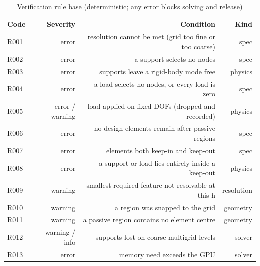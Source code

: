 \begin{table}[t]
\centering\small
\caption{Verification rule base (deterministic; any error blocks solving and release)}
\label{tab:t2_rules}
\begin{tabular}{lrrr}
\toprule
Code & Severity & Condition & Kind \\
\midrule
R001 & error & resolution cannot be met (grid too fine or too coarse) & spec \\
R002 & error & a support selects no nodes & spec \\
R003 & error & supports leave a rigid-body mode free & physics \\
R004 & error & a load selects no nodes, or every load is zero & spec \\
R005 & error / warning & load applied on fixed DOFs (dropped and recorded) & physics \\
R006 & error & no design elements remain after passive regions & spec \\
R007 & error & elements both keep-in and keep-out & spec \\
R008 & error & a support or load lies entirely inside a keep-out & physics \\
R009 & warning & smallest required feature not resolvable at this h & resolution \\
R010 & warning & a region was snapped to the grid & geometry \\
R011 & warning & a passive region contains no element centre & geometry \\
R012 & warning / info & supports lost on coarse multigrid levels & solver \\
R013 & error & memory need exceeds the GPU & solver \\
\bottomrule
\end{tabular}
\end{table}
